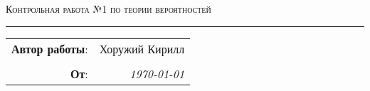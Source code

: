 
\begin{center}
    \LARGE \textsc{Контрольная работа №1 по теории вероятностей}
\end{center}

\hrule

\phantom{42}

\begin{flushright}
    \begin{tabular}{rr}
        \textbf{Автор работы}: 
        & Хоружий Кирилл \\
        & \\
        \textbf{От}: &
        \textit{\today}\\
    \end{tabular}
\end{flushright}

